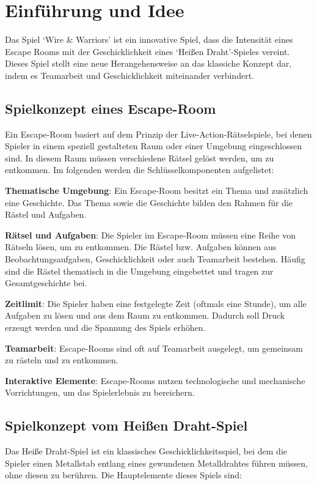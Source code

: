 \chapter{Einführung und Idee}

Das Spiel `Wire \& Warriors' ist ein innovative Spiel, dass die Intensität eines Escape Rooms mit der Geschicklichkeit eines `Heißen Draht'-Spieles vereint. Dieses Spiel stellt eine neue Herangehensweise an das klassiche Konzept dar, indem es Teamarbeit und Geschicklichkeit miteinander verbindert.

\section{Spielkonzept eines Escape-Room}

Ein Escape-Room basiert auf dem Prinzip der Live-Action-Rätselspiele, bei denen Spieler in einem speziell gestalteten Raum oder einer Umgebung eingeschlossen sind. In diesem Raum müssen verschiedene Rätsel gelöst werden, um zu entkommen. Im folgenden werden die Schlüsselkomponenten aufgelistet:

\begin{compactitem}
 \item \textbf{Thematische Umgebung}: Ein Escape-Room besitzt ein Thema und zusätzlich eine Geschichte. Das Thema sowie die Geschichte bilden den Rahmen für die Rästel und Aufgaben.
 \item \textbf{Rätsel und Aufgaben}: Die Spieler im Escape-Room müssen eine Reihe von Rätseln lösen, um zu entkommen. Die Rästel bzw. Aufgaben können aus Beobachtungsaufgaben, Geschicklichkeit oder auch Teamarbeit bestehen. Häufig sind die Rästel thematisch in die Umgebung eingebettet und tragen zur Gesamtgeschichte bei.
 \item \textbf{Zeitlimit}: Die Spieler haben eine festgelegte Zeit (oftmals eine Stunde), um alle Aufgaben zu lösen und aus dem Raum zu entkommen. Dadurch soll Druck erzeugt werden und die Spannung des Spiels erhöhen.
 \item \textbf{Teamarbeit}: Escape-Rooms sind oft auf Teamarbeit ausgelegt, um gemeinsam zu rästeln und zu entkommen.
 \item \textbf{Interaktive Elemente}: Escape-Rooms nutzen technologische und mechanische Vorrichtungen, um das Spielerlebnis zu bereichern.
\end{compactitem}

\section{Spielkonzept vom Heißen Draht-Spiel}
Das Heiße Draht-Spiel ist ein klassisches Geschicklichkeitsspiel, bei dem die Spieler einen Metallstab entlang eines gewundenen Metalldrahtes führen müssen, ohne diesen zu berühren. Die Hauptelemente dieses Spiels sind:


